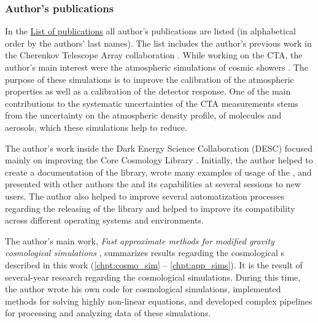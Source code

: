 \subsubsection{Author's publications}
\begin{refsection}
In the \hyperref[chpt:list_publish]{List of publications} all author's publications are listed (in alphabetical order by the authors' last names). The list includes the author's previous work in the Cherenkov Telescope Array collaboration \parencite{2016arXiv161005151C,2017arXiv170903483A,2017ApJ...840...74A,2019scta.book.....C}. While working on the CTA, the author's main interest were the atmospheric simulations of cosmic showers \parencite{2017EPJWC.14401014V,}. The purpose of these simulations is to improve the calibration of the atmospheric properties as well as a calibration of the detector response. One of the main contributions to the systematic uncertainties of the CTA measurements stems from the uncertainty on the atmospheric density profile, of molecules and aerosols, which these simulations help to reduce.

The author's work inside the Dark Energy Science Collaboration (DESC) focused mainly on improving the Core Cosmology Library \parencite[,][]{2019ascl.soft01003C,2019ApJS..242....2C}. Initially, the author helped to create a documentation of the library, wrote many examples of usage of the , and presented with other authors the  and its capabilities at several sessions to new users. The author also helped to improve several automatization processes regarding the releasing of the library and helped to improve its compatibility across different operating systems and environments.

The author's main work, \textit{Fast approximate methods for modified gravity cosmological simulations} \parencite[published in Monthly Notices of the Royal Astronomical Society,][]{2020MNRAS.493.2085V}, summarizes results regarding the cosmological \nbodysim s described in this work (\autoref{chpt:cosmo_sim} -- \autoref{chpt:app_sims}). It is the result of several-year research regarding the cosmological simulations. During this time, the author wrote his own code for cosmological simulations, implemented methods for solving highly non-linear equations, and developed complex pipelines for processing and analyzing data of these simulations.
\end{refsection}
